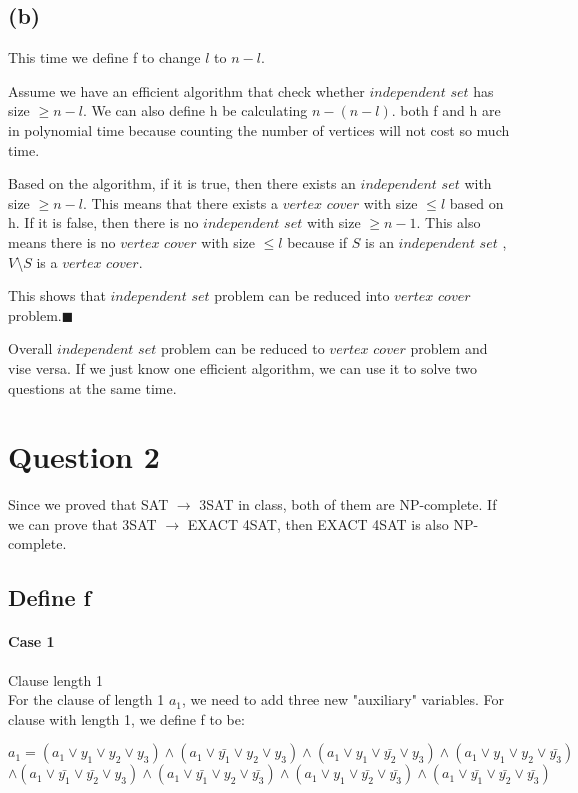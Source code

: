 \documentclass{article}
\begin{document}
\subsection*{(b)}
This time we define f to change $l$ to $n-l$.

Assume we have an efficient algorithm that check whether $independent$ $set$ has size $\geq n-l$. We can also define h be calculating $n - (n-l)$. both 
f and h are in polynomial time because counting the number of vertices will not cost so much time.

Based on the algorithm, if it is true, then there exists an $independent$ $set$ with size $\geq n-l$. This means that there exists a $vertex$ $cover$ with size 
$\leq l$ based on h. If it is false, then there is no $independent$ $set$ with size $\geq n-1$. This also means there is no $vertex$ $cover$ with size 
$\leq l$ because if $S$ is an $independent$ $set$ ,  $V$\textbackslash$S$ is a $vertex$ $cover$.

This shows that $independent$ $set$ problem can be reduced into $vertex$ $cover$ problem.$\blacksquare$

Overall $independent$ $set$ problem can be reduced to $vertex$ $cover$ problem and vise versa. If we just know one efficient algorithm, we can use it to solve 
two questions at the same time.



\section*{Question 2}
Since we proved that SAT $\rightarrow$ 3SAT in class, both of them are NP-complete.
If we can prove that 3SAT $\rightarrow$ EXACT 4SAT, then EXACT 4SAT
is also NP-complete. 
\subsection*{Define f}
\paragraph*{Case 1} Clause length 1\\

For the clause of length 1 $a_1$, we need to add three new "auxiliary" variables. For clause with length 1, we define 
f to be:


$$a_1 = (a_1\vee y_1 \vee y_2 \vee y_3) \wedge (a_1\vee \bar{y_1} \vee y_2 \vee y_3) \wedge (a_1\vee y_1 \vee \bar{y_2} \vee y_3) \wedge (a_1\vee y_1 \vee y_2 \vee \bar{y_3})$$
$$\wedge (a_1\vee \bar{y_1} \vee \bar{y_2} \vee y_3) \wedge (a_1\vee \bar{y_1} \vee y_2 \vee \bar{y_3}) \wedge (a_1\vee y_1 \vee \bar{y_2} \vee \bar{y_3}) \wedge (a_1\vee \bar{y_1} \vee \bar{y_2} \vee \bar{y_3}) $$
\end{document}
